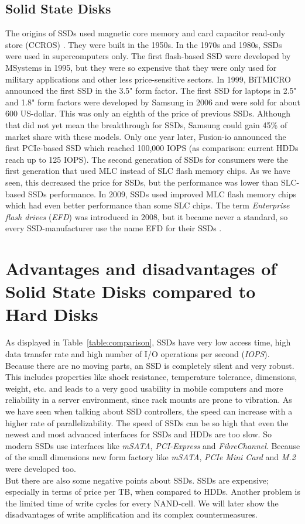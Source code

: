 \documentclass{acm_proc_article-sp}
\begin{document}
\subsection{Solid State Disks}
The origins of SSDs used magnetic core memory and card capacitor read-only store (CCROS) \cite{originssds}. They were built in the 1950s. In the 1970s and 1980s, SSDs were used in supercomputers only. The first flash-based SSD were developed by MSystems in 1995, but they were so expensive that they were only used for military applications and other less price-sensitive sectors. In 1999, BiTMICRO announced the first SSD in the 3.5" form factor. The first SSD for laptops in 2.5" and 1.8" form factors were developed by Samsung in 2006 and were sold for about 600 US-dollar. This was only an eighth of the price of previous SSDs. Although that did not yet mean the breakthrough for SSDs, Samsung could gain 45\% of market share with these models. Only one year later, Fusion-io announced the first PCIe-based SSD which reached 100,000 IOPS (as comparison: current HDDs reach up to 125 IOPS). The second generation of SSDs for consumers were the first generation that used MLC instead of SLC flash memory chips. As we have seen, this decreased the price for SSDs, but the performance was lower than SLC-based SSDs performance. In 2009, SSDs used improved MLC flash memory chips which had even better performance than some SLC chips. The term \emph{Enterprise flash drives} (\emph{EFD}) was introduced in 2008, but it became never a standard, so every SSD-manufacturer use the name EFD for their SSDs \cite{efds}.

{
\section{Advantages and disadvantages of Solid State Disks compared to Hard Disks}
}
As displayed in Table~\ref{table:comparison}, SSDs have very low access time, high data transfer rate and high number of I/O operations per second (\emph{IOPS}). Because there are no moving parts, an SSD is completely silent and very robust. This includes properties like shock resistance, temperature tolerance, dimensions, weight, etc. and leads to a very good usability in mobile computers and more reliability in a server environment, since rack mounts are prone to vibration. As we have seen when talking about SSD controllers, the speed can increase with a higher rate of parallelizability. The speed of SSDs can be so high that even the newest and most advanced interfaces for SSDs and HDDs are too slow. So modern SSDs use interfaces like \emph{mSATA}, \emph{PCI-Express} and \emph{FibreChannel}. Because of the small dimensions new form factory like \emph{mSATA}, \emph{PCIe Mini Card} and \emph{M.2} were developed too.
\\
But there are also some negative points about SSDs. SSDs are expensive; especially in terms of price per TB, when compared to HDDs. Another problem is the limited time of write cycles for every NAND-cell. We will later show the disadvantages of write amplification and its complex countermeasures.
\end{document}
